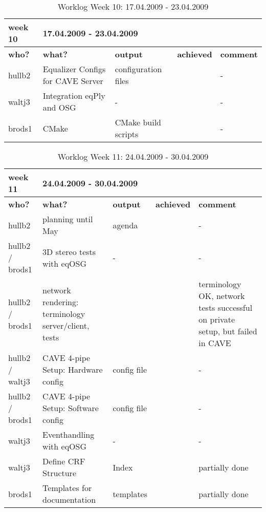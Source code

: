 \begin{table}[H]
	\centering
	\begin{tabular}{|b{}|p{}|p{}|p{}|p{}|}
		\hline \bfseries week 10 & \multicolumn{4}{l|}{\bfseries 17.04.2009 - 23.04.2009} \\
		\hline
		\hline \bfseries who? & \bfseries what? & \bfseries output & \bfseries achieved & \bfseries comment \\ 
		\hline hullb2 & Equalizer Configs for CAVE Server & configuration files & \tick & \quad\quad- \\
		\hline waltj3 & Integration eqPly and OSG & \quad\quad- & \tick & \quad\quad- \\
		\hline brods1 & CMake & CMake build scripts & \tick & \quad\quad- \\
		\hline
	\end{tabular}
	\caption{Worklog Week 10: 17.04.2009 - 23.04.2009}
\end{table}

\begin{table}[H]
	\centering
	\begin{tabular}{|b{}|p{}|p{}|p{}|p{}|}
		\hline \bfseries week 11 & \multicolumn{4}{l|}{\bfseries 24.04.2009 - 30.04.2009} \\
		\hline
		\hline \bfseries who? & \bfseries what? & \bfseries output & \bfseries achieved & \bfseries comment \\ 
		\hline hullb2 & planning until May & agenda & \tick & \quad\quad- \\
		\hline hullb2 / brods1 & 3D stereo tests with eqOSG & \quad\quad- & \tick & \quad\quad- \\
		\hline hullb2 / brods1 & network rendering: terminology server/client, tests & \quad\quad & \cross & terminology OK, network tests successful on private setup, but failed in CAVE \\
		\hline hullb2 / waltj3 & CAVE 4-pipe Setup: Hardware config & config file & \tick & \quad\quad- \\
		\hline hullb2 / brods1 & CAVE 4-pipe Setup: Software config & config file & \tick & \quad\quad- \\
		\hline waltj3 & Eventhandling with eqOSG & \quad\quad -  & \tick & \quad\quad- \\
		\hline waltj3 & Define CRF Structure & Index & \quad\quad\color{yellow}{\bfseries!} & partially done \\
		\hline brods1 & Templates for documentation & templates & \quad\quad\color{yellow}{\bfseries!} & partially done \\
		\hline
	\end{tabular}
	\caption{Worklog Week 11: 24.04.2009 - 30.04.2009}
\end{table}

